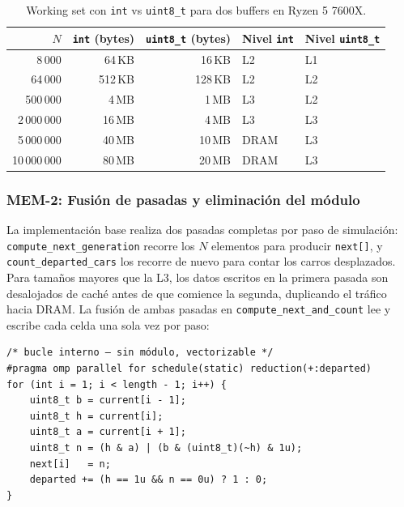 \begin{table}[H]
\centering
\caption{Working set con \texttt{int} vs \texttt{uint8\_t} para dos buffers en Ryzen 5 7600X.}
\label{tab:ws}
\begin{tabular}{r r r l l}
\hline
$N$ &
\texttt{int} (bytes) &
\texttt{uint8\_t} (bytes) &
Nivel \texttt{int} &
Nivel \texttt{uint8\_t} \\
\hline
8\,000       & 64\,KB   & 16\,KB  & L2          & L1 \\
64\,000      & 512\,KB  & 128\,KB & L2          & L2 \\
500\,000     & 4\,MB    & 1\,MB   & L3          & L2 \\
2\,000\,000  & 16\,MB   & 4\,MB   & L3          & L3 \\
5\,000\,000  & 40\,MB   & 10\,MB  & DRAM        & L3 \\
10\,000\,000 & 80\,MB   & 20\,MB  & DRAM        & L3 \\
\hline
\end{tabular}
\end{table}
\subsubsection{MEM-2: Fusión de pasadas y eliminación del módulo}

La implementación base realiza dos pasadas completas por paso de
simulación: \newline \texttt{compute\_next\_generation} recorre los $N$ elementos
para producir \texttt{next[]}, y \texttt{count\_departed\_cars} los
recorre de nuevo para contar los carros desplazados. Para tamaños mayores
que la L3, los datos escritos en la primera pasada son desalojados de caché
antes de que comience la segunda, duplicando el tráfico hacia DRAM. La
fusión de ambas pasadas en \texttt{compute\_next\_and\_count} lee y escribe
cada celda una sola vez por paso:

\begin{center}
\begin{verbatim}
/* bucle interno — sin módulo, vectorizable */
#pragma omp parallel for schedule(static) reduction(+:departed)
for (int i = 1; i < length - 1; i++) {
    uint8_t b = current[i - 1];
    uint8_t h = current[i];
    uint8_t a = current[i + 1];
    uint8_t n = (h & a) | (b & (uint8_t)(~h) & 1u);
    next[i]   = n;
    departed += (h == 1u && n == 0u) ? 1 : 0;
}
\end{verbatim}
\end{center}

